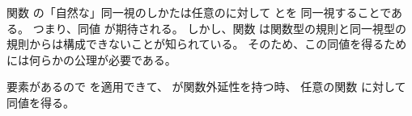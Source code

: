 \documentclass[index]{subfiles}
\begin{document}

関数
の「自然な」同一視のしかたは任意のに対して
とを
同一視することである。
つまり、同値
が期待される。
しかし、関数
は関数型の規則と同一視型の規則からは構成できないことが知られている。
そのため、この同値を得るためには何らかの公理が必要である。



要素があるので
を適用できて、
が関数外延性を持つ時、
任意の関数
に対して同値を得る。




\begin{mySubsections}
  
\end{mySubsections}
\end{document}

